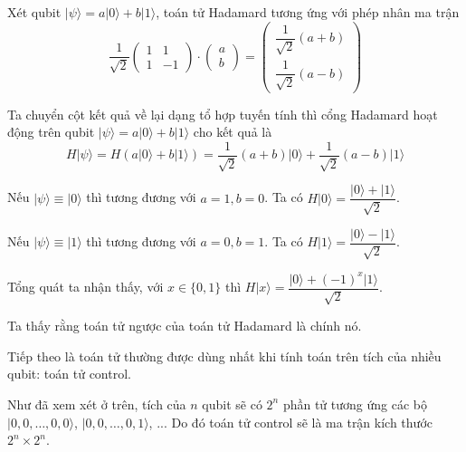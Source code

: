 \begin{example}
    Xét qubit $\lvert \psi \rangle = a \lvert 0 \rangle + b \lvert 1 \rangle$, toán tử Hadamard tương ứng với phép nhân ma trận
    \begin{equation*}
        \dfrac{1}{\sqrt{2}} \begin{pmatrix} 1 & 1 \\ 1 & - 1 \end{pmatrix} \cdot \begin{pmatrix} a \\ b \end{pmatrix} = \begin{pmatrix} \dfrac{1}{\sqrt{2}} (a + b) \\ \dfrac{1}{\sqrt{2}} (a - b) \end{pmatrix}
    \end{equation*}

    Ta chuyển cột kết quả về lại dạng tổ hợp tuyến tính thì cổng Hadamard hoạt động trên qubit $\lvert \psi \rangle = a \lvert 0 \rangle + b \lvert 1 \rangle$ cho kết quả là
    \begin{equation*}
        H \lvert \psi \rangle = H(a \lvert 0 \rangle + b \lvert 1 \rangle) = \dfrac{1}{\sqrt{2}} (a + b) \lvert 0 \rangle + \dfrac{1}{\sqrt{2}} (a - b) \lvert 1 \rangle
    \end{equation*}
\end{example}

Nếu $\lvert \psi \rangle \equiv \lvert 0 \rangle$ thì tương đương với $a = 1, b = 0$. Ta có $H \lvert 0 \rangle = \dfrac{\lvert 0 \rangle + \lvert 1 \rangle}{\sqrt{2}}$.

Nếu $\lvert \psi \rangle \equiv \lvert 1 \rangle$ thì tương đương với $a = 0, b = 1$. Ta có $H \lvert 1 \rangle = \dfrac{\lvert 0 \rangle - \lvert 1 \rangle}{\sqrt{2}}$.

Tổng quát ta nhận thấy, với $x \in \{ 0, 1 \}$ thì $H \lvert x \rangle = \dfrac{\lvert 0 \rangle + (-1)^x \lvert 1 \rangle}{\sqrt{2}}$.

Ta thấy rằng toán tử ngược của toán tử Hadamard là chính nó.

Tiếp theo là toán tử thường được dùng nhất khi tính toán trên tích của nhiều qubit: toán tử control.

Như đã xem xét ở trên, tích của $n$ qubit sẽ có $2^n$ phần tử tương ứng các bộ $\lvert 0, 0, \ldots, 0, 0 \rangle$, $\lvert 0, 0, \ldots, 0, 1 \rangle$, ... Do đó toán tử control sẽ là ma trận kích thước $2^n \times 2^n$.


